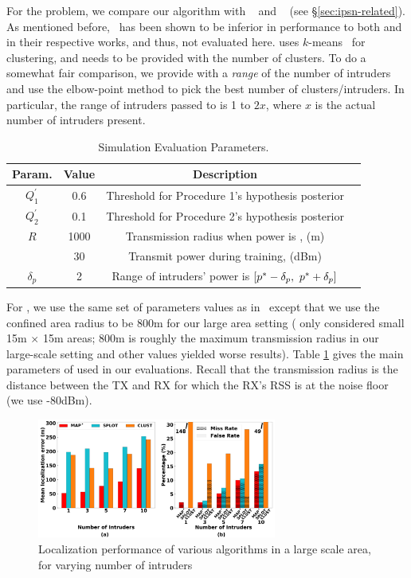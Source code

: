   For the \mtl problem, we compare our
\ouralgo algorithm with \splot~\cite{mobicom17-splot} and
\cl~\cite{clustering} (see \S\ref{sec:ipsn-related}). As mentioned
before,~\cite{Quasi-EM} has been shown to be inferior in performance
to both \splot and \cl in their respective works, and thus, not
evaluated here.
\cl uses $k$-means~\cite{scikit-learn} for clustering, and needs to be
provided with the number of clusters. To do a somewhat fair
comparison, we provide \cl with a {\em range} of the number of
intruders and use the elbow-point method to pick the best
number of clusters/intruders. In particular, the range of intruders
passed to \cl is 1 to $2x$, where $x$ is the actual number of
intruders present.
\begin{table}[ht]
	\caption{Simulation Evaluation Parameters.}
	\centering
	\begin{tabular}{c c c c}
		\hline\hline
		Param. & Value & Description \\ [0.5ex]
		\hline
		$Q^{'}_{1}$ &  0.6   & Threshold for Procedure 1's hypothesis posterior\\ 
		$Q^{'}_{2}$ &  0.1   & Threshold for Procedure 2's hypothesis posterior\\
		$R$  & 1000 & Transmission radius when power is \pstar, (m) \\
		\pstar & 30  & Transmit power during training, (dBm) \\
		$\delta_p$ & 2  & Range of intruders' power is $[p^* - \delta_p, \ p^* + \delta_p]$\\
		\hline
	\end{tabular}
	\label{table:paramaters}
\end{table}

For \splot, we use the same set of parameters values as
in~\cite{mobicom17-splot} except that we use the confined area radius
to be 800m for our large area setting (\cite{mobicom17-splot} only
considered small 15m $\times$ 15m areas; 800m is roughly the maximum
transmission radius in our large-scale setting and other values
yielded worse results).
Table \ref{table:paramaters} gives the main parameters of \ouralgo
used in our evaluations. Recall that the transmission radius is the
distance between the TX and RX for which the RX's RSS is at the noise
floor (we use -80dBm). 

\begin{figure}[ht]
	\centering
	\includegraphics[width=0.7\textwidth]{chapters/ipsn/figures/splat-vary-numintru.png}
	\caption{Localization performance of various algorithms in a large scale area, for varying number of intruders}
	\label{fig:varying-num-intruders}
\end{figure}

